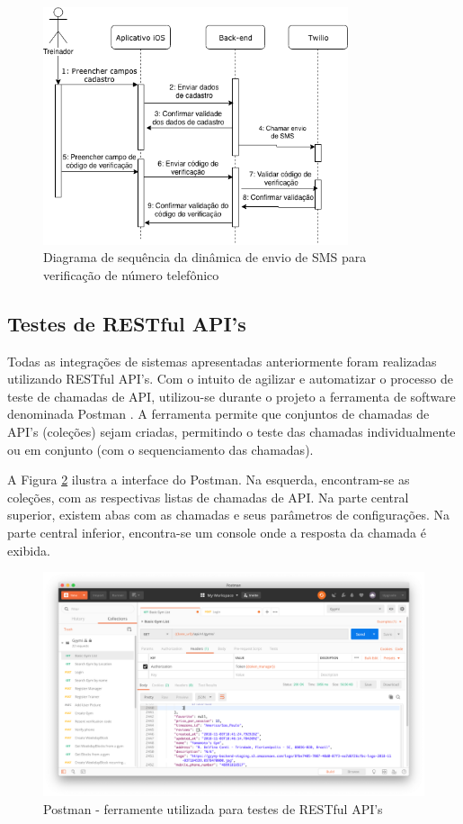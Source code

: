 \begin{figure}[H]
    \centering
    \includegraphics[width=0.8\textwidth]{pfc/figuras/seq-diagram-sms.png}
    \caption{Diagrama de sequência da dinâmica de envio de SMS para verificação de número telefônico}
    \label{fig:seq-diagram-sms}
\end{figure}

\subsection{Testes de RESTful API's}
Todas as integrações de sistemas apresentadas anteriormente foram realizadas utilizando RESTful API's. Com o intuito de agilizar e automatizar o processo de teste de chamadas de API, utilizou-se durante o projeto a ferramenta de software denominada Postman . A ferramenta permite que conjuntos de chamadas de API's (coleções) sejam criadas, permitindo o teste das chamadas individualmente ou em conjunto (com o sequenciamento das chamadas).

A Figura \ref{fig:postman} ilustra a interface do Postman. Na esquerda, encontram-se as coleções, com as respectivas listas de chamadas de API. Na parte central superior, existem abas com as chamadas e seus parâmetros de configurações. Na parte central inferior, encontra-se um console onde a resposta da chamada é exibida.

\begin{figure}[H]
    \centering
    \includegraphics[eidth=0.8\textwidth]{pfc/figuras/postman.png}
    \caption{Postman - ferramente utilizada para testes de RESTful API's}
    \label{fig:postman}
\end{figure}

